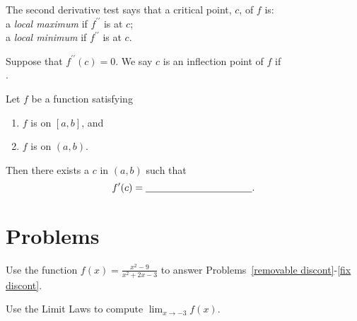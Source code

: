 \documentclass[12pt]{amsart}
\begin{document}
\begin{thm}[2 Points]
  The second derivative test says that a critical point, $c$, of $f$ is:\vspace{.15in}\\
  a \textit{local maximum} if $f^{\prime\prime}$ is {\underline{\hspace{1.5in}}} at $c$;\vspace{.15in}\\
  a \textit{local minimum} if $f^{\prime\prime}$ is {\underline{\hspace{1.5in}}} at $c$.
  \vspace{.15in}
\end{thm}
\begin{thm}[1 Point]
  Suppose that $f^{\prime\prime}(c)=0$.  We say $c$ is an inflection point of $f$ if\vspace{.15in}\\
  {\underline{\hspace{4in}}}.
\end{thm}

\begin{thm}
  Let $f$ be a function satisfying
  \vspace{.15in}
  \begin{enumerate}[1.]
  \item
    $f$ is {\underline{\hspace{1.5in}}} on $[a,b]$, and
    \vspace{.15in}
  \item
    $f$ is {\underline{\hspace{1.5in}}} on $(a,b)$.
  \end{enumerate}
  \vspace{.15in}
  Then there exists a $c$ in $(a,b)$ such that
  \[f^\prime(c)={\underline{\hspace{1.5in}}}.\]
\end{thm}

\newpage

\section*{Problems}
\noindent
Use the function \(\displaystyle{f(x) = \frac{x^2 - 9}{x^2 + 2x - 3}}\) to answer Problems~\ref{removable discont}-\ref{fix discont}.

\begin{thm}[5 Points]\label{removable discont}
  Use the Limit Laws to compute \(\lim_{x \to -3} f(x)\).
\end{thm}
\end{document}
